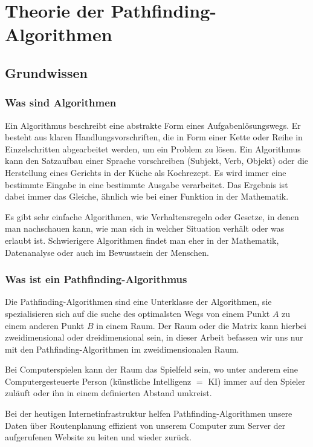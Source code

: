 \chapter{Theorie der Pathfinding-Algorithmen}

\section{Grundwissen}

\subsection{Was sind Algorithmen}

Ein Algorithmus beschreibt eine abstrakte Form eines Aufgabenlösungswegs.
Er besteht aus klaren Handlungsvorschriften, die in Form einer Kette
oder Reihe in Einzelschritten abgearbeitet werden, um ein Problem
zu lösen. Ein Algorithmus kann den Satzaufbau einer Sprache
vorschreiben (Subjekt, Verb, Objekt) oder die Herstellung eines Gerichts
in der Küche als Kochrezept. Es wird immer eine bestimmte Eingabe in
eine bestimmte Ausgabe verarbeitet. Das Ergebnis ist dabei immer das
Gleiche, ähnlich wie bei einer Funktion in der Mathematik.

Es gibt sehr einfache Algorithmen, wie Verhaltensregeln oder Gesetze, in
denen man nachschauen kann, wie man sich in welcher Situation verhält
oder was erlaubt ist. Schwierigere Algorithmen findet man eher in der
Mathematik, Datenanalyse oder auch im Bewusstsein der Menschen.
\cite[Wikipedia, 2018]{wikialgo}

\subsection{Was ist ein Pathfinding-Algorithmus}

Die Pathfinding-Algorithmen sind eine Unterklasse der Algorithmen, sie
spezialisieren sich auf die suche des optimalsten Wegs von einem Punkt $A$
zu einem anderen Punkt $B$ in einem Raum. Der Raum oder die Matrix kann hierbei
zweidimensional oder dreidimensional sein, in dieser Arbeit befassen wir
uns nur mit den Pathfinding-Algorithmen im zweidimensionalen Raum.

Bei Computerspielen kann der Raum das Spielfeld sein, wo unter anderem
eine Computergesteuerte Person (künstliche Intelligenz $=$ KI) immer auf
den Spieler zuläuft oder ihn in einem definierten Abstand umkreist.

Bei der heutigen Internetinfrastruktur helfen Pathfinding-Algorithmen unsere Daten über Routenplanung effizient von unserem
Computer zum Server der aufgerufenen Website zu leiten und wieder zurück.

